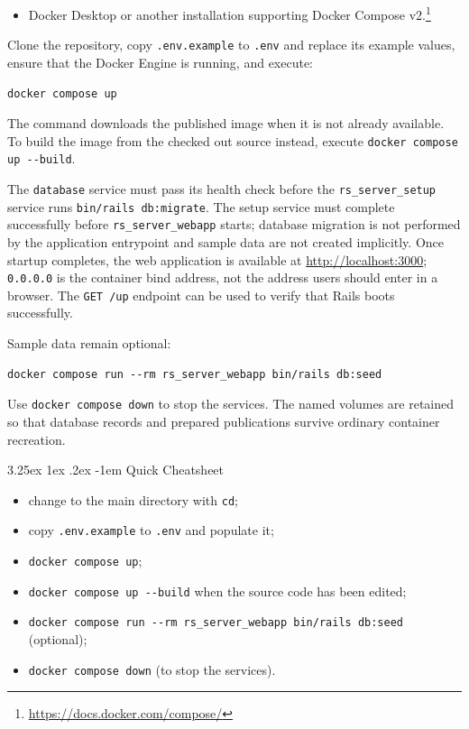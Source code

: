 \documentclass[a4paper, english]{article}
\makeatletter
\newcounter{subsubsubsection}[subsubsection]
\renewcommand\paragraph{\@startsection{paragraph}{5}{\z@}%
  {3.25ex \@plus1ex \@minus.2ex}%
  {-1em}%
  {\normalfont\normalsize\bfseries}}
\makeatother
\begin{document}

\begin{itemize}
\item Docker Desktop or another installation supporting Docker Compose v2.\footnote{\url{https://docs.docker.com/compose/}}
\end{itemize}


Clone the repository, copy \verb|.env.example| to \verb|.env| and replace its example values, ensure that the Docker Engine is running, and execute:

\begin{lstlisting}
docker compose up
\end{lstlisting}

The command downloads the published image when it is not already available. To build the image from the checked out source instead, execute \verb|docker compose up --build|.

The \verb|database| service must pass its health check before the \verb|rs_server_setup| service runs \verb|bin/rails db:migrate|. The setup service must complete successfully before \verb|rs_server_webapp| starts; database migration is not performed by the application entrypoint and sample data are not created implicitly. Once startup completes, the web application is available at \url{http://localhost:3000}; \verb|0.0.0.0| is the container bind address, not the address users should enter in a browser. The \verb|GET /up| endpoint can be used to verify that Rails boots successfully.

Sample data remain optional:

\begin{lstlisting}
docker compose run --rm rs_server_webapp bin/rails db:seed
\end{lstlisting}

Use \verb|docker compose down| to stop the services. The named volumes are retained so that database records and prepared publications survive ordinary container recreation.

\paragraph{Quick Cheatsheet}

\begin{itemize}
\item change to the main directory with \verb|cd|;
\item copy \verb|.env.example| to \verb|.env| and populate it;
\item \verb|docker compose up|;
\item \verb|docker compose up --build| when the source code has been edited;
\item \verb|docker compose run --rm rs_server_webapp bin/rails db:seed| (optional);
\item \verb|docker compose down| (to stop the services).
\end{itemize}
\end{document}
